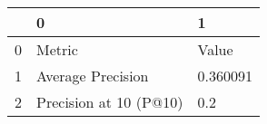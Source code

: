 \begin{tabular}{lll}
\toprule
{} &                       0 &         1 \\
\midrule
0 &                  Metric &     Value \\
1 &       Average Precision &  0.360091 \\
2 &  Precision at 10 (P@10) &       0.2 \\
\bottomrule
\end{tabular}
